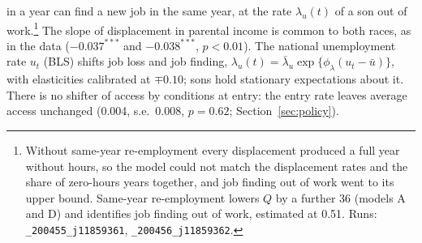 in a year can find a new job in the same year, at the rate $\lambda_u(t)$ of a son out of work.\footnote{Without
same-year re-employment every displacement produced a full year without hours, so the model could not match the
displacement rates and the share of zero-hours years together, and job finding out of work went to its upper bound.
Same-year re-employment lowers $Q$ by a further 36 (models A and D) and identifies job finding out of work, estimated at
0.51. Runs: \texttt{\_200455\_j11859361}, \texttt{\_200456\_j11859362}.} The slope of displacement in parental income is
common to both races, as in the data ($-0.037^{***}$ and $-0.038^{***}$, $p < 0.01$). The national unemployment rate
$u_t$ (BLS) shifts job loss and job finding, $\lambda_u(t) = \bar\lambda_u \exp\{\phi_\lambda(u_t - \bar u)\}$, with
elasticities calibrated at $\mp 0.10$; sons hold stationary expectations about it. There is no shifter of access by
conditions at entry: the entry rate leaves average access unchanged (0.004, s.e.\ 0.008, $p = 0.62$;
Section~\ref{sec:policy}).


